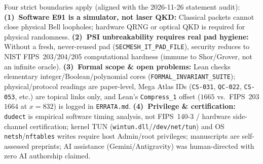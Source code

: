\documentclass[10pt,letterpaper]{article}
\newcommand{\code}[1]{\texttt{\fontsize{7.8pt}{9.2pt}\selectfont #1}}
\begin{document}
\begin{tcolorbox}[amberbox, fontupper=\fontsize{7.45pt}{8.85pt}\selectfont, top=3.2pt, bottom=3.0pt, title={Honest Scientific \& Operational Boundaries (Zero-Hype Disclosure)}]
Four strict boundaries apply (aligned with the 2026-11-26 statement audit):
\textbf{(1)~Software E91 is a simulator, not laser QKD:} Classical packets cannot close physical Bell loopholes; hardware QRNG or optical QKD is required for physical randomness.
\textbf{(2)~PSI unbreakability requires real pad hygiene:} Without a fresh, never-reused pad (\code{SECMESH\_IT\_PAD\_FILE}), security reduces to NIST FIPS~203/204/205 computational hardness (immune to Shor/Grover, not an infinite oracle).
\textbf{(3)~Formal scope \& open problems:} Lean checks elementary integer/Boolean/polynomial cores (\code{FORMAL\_INVARIANT\_SUITE}); physical/protocol readings are paper-level, Mega Atlas IDs (\code{CS-031}, \code{QC-022}, \code{CS-053}, etc.) are topical links only, and Lean's \code{Compress\_1} offset ($1665$ vs.\ FIPS~203 $1664$ at $x{=}832$) is logged in \code{ERRATA.md}.
\textbf{(4)~Privilege \& certification:} \code{dudect} is empirical software timing analysis, not FIPS~140-3 / hardware side-channel certification; kernel TUN (\code{wintun.dll}/\code{/dev/net/tun}) and OS \code{netsh}/\code{nftables} writes require host Admin/root privileges; manuscripts are self-assessed preprints; AI assistance (Gemini/Antigravity) was human-directed with zero AI authorship claimed.
\end{tcolorbox}
\end{document}
